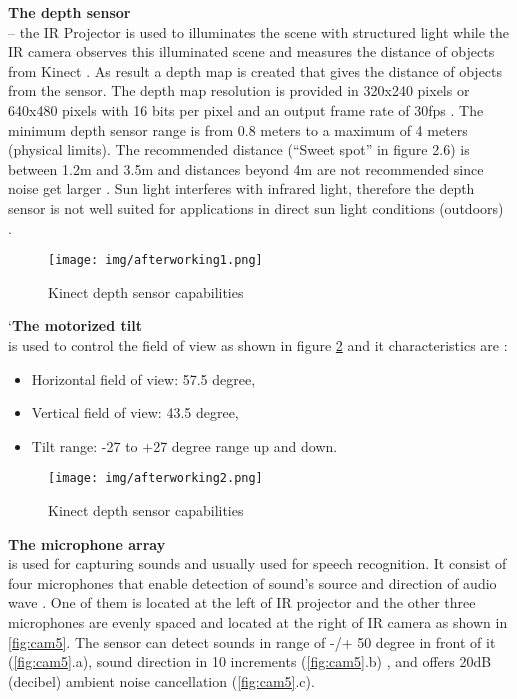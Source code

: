 \textbf{The depth sensor} \\
– the IR Projector is used to illuminates the scene with structured light while the IR camera observes this illuminated scene and measures the distance of objects from Kinect \cite{kinect15}. As result a depth map is created that gives the distance of objects from the sensor. The depth
map resolution is provided in 320x240 pixels or 640x480 pixels with 16 bits per pixel and an  output frame rate of 30fps \cite{kinect15}. The minimum depth sensor range is from 0.8 meters to a maximum of 4 meters (physical limits). The recommended distance (“Sweet spot” in figure 2.6) is between 1.2m and 3.5m and distances beyond 4m are not recommended since noise get larger \cite{kinect17}. Sun light interferes with infrared light, therefore the depth sensor is not well suited for applications in direct sun light conditions (outdoors)\cite{kinect17} .  

\begin{figure}[H]
\centering
\texttt{[image: img/afterworking1.png]}
\caption{Kinect depth sensor capabilities}
\label{fig:cam3}
\end{figure}

`\textbf{The motorized tilt}\\
 is used to control the field of view as shown in figure \ref{fig:cam4} and it characteristics are \cite{kinect15} : 
 
\begin{itemize}
\item  Horizontal field of view: 57.5 degree,
\item  Vertical field of view: 43.5 degree,
\item Tilt range: -27 to +27 degree range up and down.

\end{itemize}

\begin{figure}[H]
\centering
\texttt{[image: img/afterworking2.png]}
\caption{Kinect depth sensor capabilities}
\label{fig:cam4}
\end{figure}

\textbf{The microphone array} \\
is used for capturing sounds and usually used for speech recognition. It consist of four microphones that enable detection of sound’s source and direction of audio wave \cite{kinect15}. One of them is located at the left of IR projector and the other three microphones are evenly spaced and located at the right of IR camera as shown in \ref{fig:cam5}. The sensor can detect sounds in range of -/+ 50 degree in front of it (\ref{fig:cam5}.a), sound direction in 10 increments  (\ref{fig:cam5}.b) , and offers 20dB (decibel) ambient noise cancellation (\ref{fig:cam5}.c)\cite{kinect17}.

